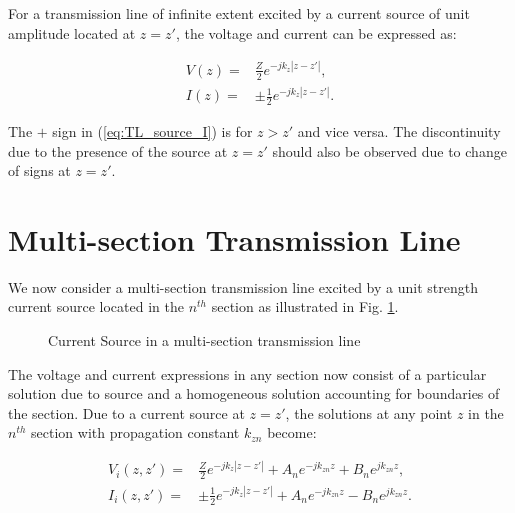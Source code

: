 \documentclass[11pt]{article}
\renewcommand{\^}{\hat}  %
\begin{document}
For a transmission line of infinite extent excited by a current source of unit amplitude located at $z = z'$, the voltage and current can be expressed as:

\begin{subequations}
  \begin{align}
    V(z) ={}& \frac{Z}{2} e^{-jk_z \left|z-z'\right| },
    \label{eq:TL_source_V}\\
    I(z) ={}& \pm \frac{1}{2} e^{-jk_z \left|z-z'\right|}.
    \label{eq:TL_source_I}
  \end{align}
  \label{eq:TL_source}
\end{subequations}

The $+$ sign in (\ref{eq:TL_source_I}) is for $z > z'$ and vice versa. The discontinuity due to the presence of the source at $z = z'$ should also be observed due to change of signs at $ z = z'$.

\section{Multi-section Transmission Line}

We now consider a multi-section transmission line excited by a unit strength current source located in the $n^{th}$ section as illustrated in Fig. \ref{fig:TL}.

\begin{figure}[h!]
  \centering
  
  \caption{Current Source in a multi-section transmission line}
  \label{fig:TL}
\end{figure}

The voltage and current expressions in any section now consist of a particular solution due to source and a homogeneous solution accounting for boundaries of the section. Due to a current source at $z = z'$, the solutions at any point $z$ in the $n^{th}$ section with propagation constant $k_{zn}$ become:

\begin{subequations}
  \begin{align}
    V_i(z, z') ={}& \frac{Z}{2} e^{-jk_z \left|z-z'\right| } + A_n e^{-j k_{zn} z } + B_n e^{j k_{zn} z},
    \label{eq:multi_V}\\
    I_i(z, z') ={}& \pm \frac{1}{2} e^{-jk_z \left|z-z'\right|} + A_n e^{-j k_{zn} z } - B_n e^{j k_{zn} z}.
    \label{eq:multi_I}
  \end{align}
  \label{eq:multi}
\end{subequations}
\end{document}
